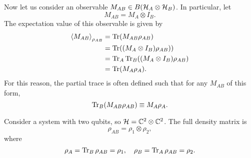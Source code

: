 Now let us consider an observable $M_{AB} \in B(\mathcal H_A \otimes \mathcal H_B)$. In particular, let
\begin{equation}
    M_{AB}=M_A \otimes I_B.
\end{equation}
The expectation value of this observable is given by
\begin{align*}
    \left< M_{AB} \right>_{\rho_{AB}} &= \operatorname{Tr} (M_{AB} \rho_{AB})\\
    &= \operatorname{Tr}((M_A\otimes I_B) \rho_{AB}))\\
    &= \operatorname{Tr}_A \operatorname{Tr}_B ((M_A \otimes I_B)\rho_{AB})\\
    &= \operatorname{Tr}(M_A \rho_A).
\end{align*}
For this reason, the partial trace is often defined such that for any $M_{AB}$ of this form,
\begin{equation}
    \operatorname{Tr}_B(M_{AB}\rho_{AB}) \equiv M_A \rho_A.
\end{equation}

\begin{exm}
Consider a system with two qubits, so $\mathcal H = \mathbb{C}^2 \otimes \mathbb{C}^2$. The full density matrix is
\begin{equation}
    \rho_{AB}=\rho_1 \otimes \rho_2,
\end{equation}
where
\begin{equation}
    \rho_A = \operatorname{Tr}_B \rho_{AB}=\rho_1, \quad \rho_B = \operatorname{Tr}_A \rho_{AB}=\rho_2.
\end{equation}
\end{exm}

